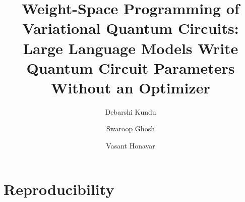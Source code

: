 \documentclass[11pt]{article}
\title{Weight-Space Programming of Variational Quantum Circuits:\\ Large Language Models Write Quantum Circuit Parameters Without an Optimizer}
\author[1]{Debarshi Kundu}
\author[1]{Swaroop Ghosh}
\author[1]{Vasant Honavar}
\affil[1]{The Pennsylvania State University}
\date{}
\begin{document}
\maketitle

\begin{abstract}

\end{abstract}










\section*{Reproducibility}





\appendix

\end{document}
